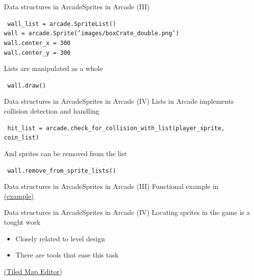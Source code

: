 \documentclass[10pt,compress]{beamer} %
\begin{document}
{\begin{frame}{Data structures in Arcade}{Sprites in Arcade (III)}
		\begin{exampleblock}{}
        \texttt{
        wall\_list = arcade.SpriteList()\\
        wall = arcade.Sprite('images/boxCrate\_double.png')\\
        wall.center\_x = 300\\
        wall.center\_y = 300}
		\end{exampleblock}

       Lists are manipulated as a whole

		\begin{exampleblock}{}
        \texttt{
        wall.draw()
        }
		\end{exampleblock}
\end{frame}

\begin{frame}{Data structures in Arcade}{Sprites in Arcade (IV)}
    Lists in Arcade implements \alert{collision detection} and handling
		\begin{exampleblock}{}
        \texttt{
            hit\_list = arcade.check\_for\_collision\_with\_list(player\_sprite,
                                                              coin\_list)
        }
		\end{exampleblock}

    And sprites can be removed from the list
		\begin{exampleblock}{}
        \texttt{
        wall.remove\_from\_sprite\_lists()
        }
		\end{exampleblock}
\end{frame}

\begin{frame}{Data structures in Arcade}{Sprites in Arcade (III)}
    Functional example in \href{https://gist.github.com/dfbarrero/83294a5ea218ca866b68558d4d64ba46}{(example)}
\end{frame}

\begin{frame}{Data structures in Arcade}{Sprites in Arcade (IV)}
    Locating sprites in the game is a tought work
    \begin{itemize}
        \item Closely related to \alert{level design}
        \item There are tools that ease this task
    \end{itemize}
    \href{https://www.mapeditor.org/}{(Tiled Map Editor)}
\end{frame}



}
\end{document}
